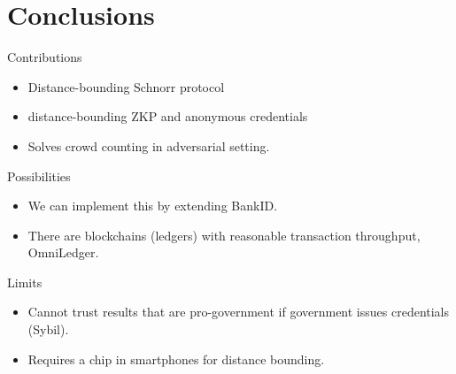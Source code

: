 \section{Conclusions}

\begin{frame}
  \begin{block}{Contributions}
    \begin{itemize}
      \item Distance-bounding Schnorr protocol
      \item \Ie distance-bounding \acs{ZKP} and anonymous credentials
      \item Solves crowd counting in adversarial setting.
    \end{itemize}
  \end{block}
\end{frame}

\begin{frame}
  \begin{greenblock}{Possibilities}
    \begin{itemize}
      \item We can implement this by extending BankID.
      \item There are blockchains (ledgers) with reasonable transaction 
        throughput, \eg OmniLedger.
    \end{itemize}
  \end{greenblock}

  \pause

  \begin{alertblock}{Limits}
    \begin{itemize}
      \item Cannot trust results that are pro-government if government issues 
        credentials (Sybil).

      \item Requires a chip in smartphones for distance bounding.
    \end{itemize}
  \end{alertblock}
\end{frame}
